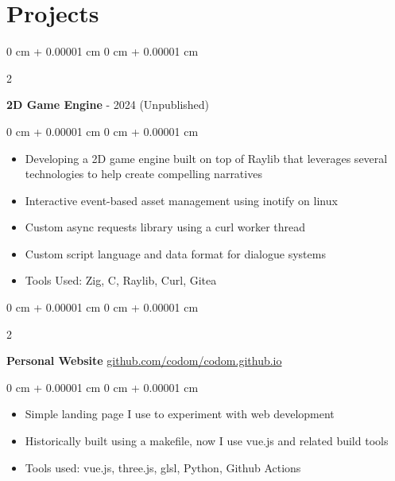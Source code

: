 \documentclass[10pt, letterpaper]{article}
\newenvironment{highlights}{
    \begin{itemize}[
        topsep=0.10 cm,
        parsep=0.10 cm,
        partopsep=0pt,
        itemsep=0pt,
        leftmargin=0 cm + 10pt
    ]
}{
    \end{itemize}
} %
\newenvironment{onecolentry}{
    \begin{adjustwidth}{
        0 cm + 0.00001 cm
    }{
        0 cm + 0.00001 cm
    }
}{
    \end{adjustwidth}
} %
\newenvironment{twocolentry}[2][]{
    \onecolentry
    \def\secondColumn{#2}
    \setcolumnwidth{\fill, 6.0 cm}
    \begin{paracol}{2}
}{
    \switchcolumn \raggedleft \secondColumn
    \end{paracol}
    \endonecolentry
} %
\begin{document}
    
    \section{Projects}

        \begin{twocolentry}{
            2023 - 2024 (Unpublished)
        }
            \textbf{2D Game Engine}\end{twocolentry}

        \vspace{0.10 cm}
        \begin{onecolentry}
            \begin{highlights}
                \item Developing a 2D game engine built on top of Raylib that leverages several technologies to help create compelling narratives
                \item Interactive event-based asset management using inotify on linux
                \item Custom async requests library using a curl worker thread
                \item Custom script language and data format for dialogue systems
                \item Tools Used: Zig, C, Raylib, Curl, Gitea
            \end{highlights}
        \end{onecolentry}


        \vspace{0.2 cm}

        \begin{twocolentry}{
            \href{https://github.com/codom/codom.github.io}{github.com/codom/codom.github.io}
        }
        \textbf{Personal Website}\end{twocolentry}

        \vspace{0.10 cm}
        \begin{onecolentry}
            \begin{highlights}
              \item Simple landing page I use to experiment with web development
              \item Historically built using a makefile, now I use vue.js and related build tools
              \item Tools used: vue.js, three.js, glsl, Python, Github Actions
            \end{highlights}
        \end{onecolentry}
\end{document}
